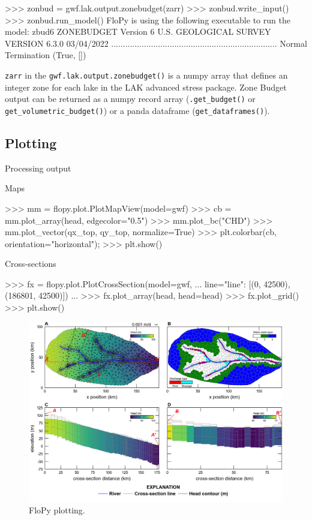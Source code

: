 \documentclass[11pt, oneside]{article}  	%
\begin{document}
\begin{python}
>>> zonbud = gwf.lak.output.zonebudget(zarr)
>>> zonbud.write_input()
>>> zonbud.run_model()
FloPy is using the following executable to run the model: zbud6
                    ZONEBUDGET Version 6
                   U.S. GEOLOGICAL SURVEY
                  VERSION 6.3.0 03/04/2022
.......................................................................
Normal Termination
(True, [])
\end{python}

\noindent \texttt{zarr} in the \texttt{gwf.lak.output.zonebudget()} is a numpy array that defines an integer zone for each lake in the LAK advanced stress package. Zone Budget output can be returned as a numpy record array (\texttt{.get\_budget()} or \texttt{get\_volumetric\_budget()}) or a panda dataframe (\texttt{get\_dataframes()}).

\subsection{Plotting}

Processing output

Maps

\begin{python}
>>> mm = flopy.plot.PlotMapView(model=gwf)
>>> cb = mm.plot_array(head, edgecolor="0.5")
>>> mm.plot_bc("CHD")
>>> mm.plot_vector(qx_top, qy_top, normalize=True)
>>> plt.colorbar(cb, orientation="horizontal");
>>> plt.show()
\end{python}

Cross-sections 

\begin{python}
>>> fx = flopy.plot.PlotCrossSection(model=gwf, 
... line={"line": [(0, 42500), (186801, 42500)]})
...
>>> fx.plot_array(head, head=head)
>>> fx.plot_grid()
>>> plt.show()
\end{python}


\begin{figure}[ht!]
	\begin{center}
		\includegraphics{figures/grids_flopy_plots.png}
	\end{center}
	\caption{FloPy plotting.}
	\label{fig:flopyplots}
\end{figure}
\end{document}
